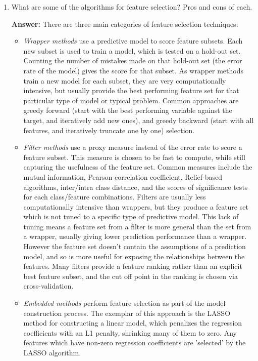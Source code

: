 \documentclass{article}
\newenvironment{QandA}{\begin{enumerate}[label=\arabic*.]}{\end{enumerate}}
\newenvironment{InnerQandA}{\begin{enumerate}[label=\roman*.]}{\end{enumerate}}
\newenvironment{answer}{\par\normalfont \textbf{Answer:}}{}
\begin{document}
\begin{QandA}
\begin{InnerQandA}
        \item What are some of the algorithms for feature selection? Pros and cons of each.
        \begin{answer}
            There are three main categories of feature selection techniques:
            \begin{itemize}
                \item \textit{Wrapper methods} use a predictive model to score feature subsets. Each new subset is used to train a model, which is tested on a hold-out set. Counting the number of mistakes made on that hold-out set (the error rate of the model) gives the score for that subset. As wrapper methods train a new model for each subset, they are very computationally intensive, but usually provide the best performing feature set for that particular type of model or typical problem. Common approaches are greedy forward (start with the best performing variable against the target, and iteratively add new ones), and greedy backward (start with all features, and iteratively truncate one by one) selection.
                \item \textit{Filter methods} use a proxy measure instead of the error rate to score a feature subset. This measure is chosen to be fast to compute, while still capturing the usefulness of the feature set. Common measures include the mutual information, Pearson correlation coefficient, Relief-based algorithms, inter/intra class distance, and the scores of significance tests for each class/feature combinations. Filters are usually less computationally intensive than wrappers, but they produce a feature set which is not tuned to a specific type of predictive model. This lack of tuning means a feature set from a filter is more general than the set from a wrapper, usually giving lower prediction performance than a wrapper. However the feature set doesn't contain the assumptions of a prediction model, and so is more useful for exposing the relationships between the features. Many filters provide a feature ranking rather than an explicit best feature subset, and the cut off point in the ranking is chosen via cross-validation. 
                \item \textit{Embedded methods} perform feature selection as part of the model construction process. The exemplar of this approach is the LASSO method for constructing a linear model, which penalizes the regression coefficients with an L1 penalty, shrinking many of them to zero. Any features which have non-zero regression coefficients are 'selected' by the LASSO algorithm.
            \end{itemize}


\end{answer}
\end{InnerQandA}
\end{QandA}
\end{document}
